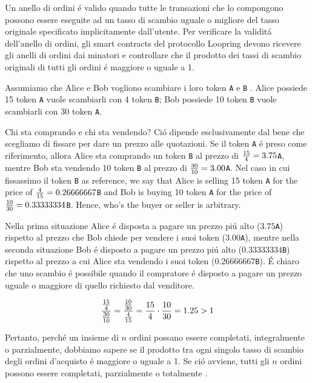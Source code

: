 \documentclass[UTF8,nofonts]{article}
\begin{document}
\begin{multicols}{2}
Un anello di ordini \'e valido quando tutte le transazioni che lo compongono possono essere eseguite ad un tasso di scambio uguale o migliore del tasso originale specificato implicitamente dall'utente. Per verificare la validit\'a dell'anello di ordini, gli smart contracts del protocollo Loopring devono ricevere gli anelli di ordini dai minatori e controllare che il prodotto dei tassi di scambio originali di tutti gli ordini \'e maggiore o uguale a 1.

Assumiamo che Alice e Bob vogliono scambiare i loro token \verb|A| e \verb|B| . Alice possiede 15 token \verb|A| vuole scambiarli con 4 token \verb|B|; Bob possiede 10 token \verb|B| vuole scambiarli con 30 token \verb|A|.

Chi sta comprando e chi sta vendendo? Ci\'o dipende esclusivamente dal bene che scegliamo di fissare per dare un prezzo alle quotazioni. Se il token \verb|A|  \'e preso come riferimento, allora Alice sta comprando un token \verb|B| al prezzo di ${15 \over 4} = 3.75$\verb|A|, mentre Bob sta vendendo 10 token \verb|B| al prezzo di ${30 \over 10} = 3.00$\verb|A|. Nel caso in cui fissassimo il token \verb|B| as reference, we say that Alice is selling 15 token \verb|A| for the price of ${4\over 15}=0.26666667$\verb|B| and Bob is buying 10 token \verb|A| for the price of ${10 \over 30}=0.33333334$\verb|B|. Hence, who's the buyer or seller is arbitrary.

Nella prima situazione Alice \'e disposta a pagare un prezzo pi\'u alto ($3.75$\verb|A|) rispetto al prezzo che Bob chiede per vendere i suoi token ($3.00$\verb|A|), mentre nella seconda situazione Bob \'e disposto a pagare un prezzo pi\'u alto ($0.33333334$\verb|B|) rispetto al prezzo a cui Alice sta vendendo i suoi token ($0.26666667$\verb|B|). \'E chiaro che uno scambio \'e possibile quando il compratore \'e disposto a pagare un prezzo uguale o maggiore di quello richiesto dal venditore.

\begin{equation}
{{15\over 4} \over {30\over 10}} = {{10\over 30} \over {4\over 15}}={15 \over 4} \cdot {10 \over 30} = 1.25 > 1
\end{equation}

Pertanto, perch\'e un insieme di $n$ ordini possano essere completati, integralmente o parzialmente, dobbiamo sapere se il prodotto tra ogni singolo tasso di scambio degli ordini d'acquisto \'e maggiore o uguale a 1. Se ci\'o avviene, tutti gli $n$ ordini possono essere completati, parzialmente o totalmente \cite{supersymmetry}.


\end{multicols}
\end{document}
